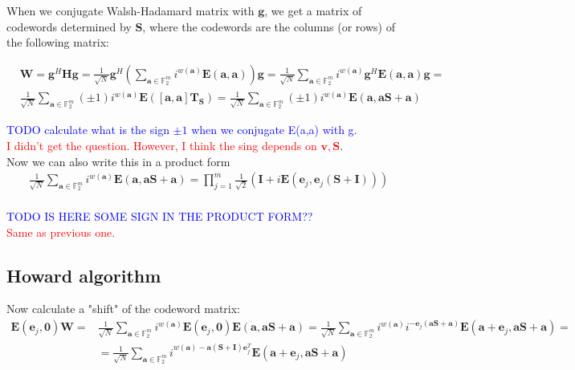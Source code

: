 \documentclass{article}
\begin{document}
	When we conjugate Walsh-Hadamard matrix with $\mathbf{g}$, we get a matrix of codewords determined by $\mathbf{S}$, where the codewords are the columns (or rows) of the following matrix:

	\begin{align*}
		&\mathbf{W} = \mathbf{g}^H\mathbf{H}\mathbf{g} = \frac{1}{\sqrt{N}}\mathbf{g}^H\left(\sum_{\mathbf{a} \in \mathbb{F}^m_2} i^{w(\mathbf{a})}\mathbf{E}(\mathbf{a},\mathbf{a})\right)\mathbf{g} = \frac{1}{\sqrt{N}}\sum_{\mathbf{a} \in \mathbb{F}^m_2} i^{w(\mathbf{a})}\mathbf{g}^H\mathbf{E}(\mathbf{a},\mathbf{a})\mathbf{g} = \\ &\frac{1}{\sqrt{N}}\sum_{\mathbf{a} \in \mathbb{F}^m_2}(\pm 1) i^{w(\mathbf{a})}\mathbf{E}(\left[\mathbf{a},\mathbf{a}\right]\mathbf{T}_\mathbf{S}) = \frac{1}{\sqrt{N}}\sum_{\mathbf{a} \in \mathbb{F}^m_2}(\pm 1) i^{w(\mathbf{a})}\mathbf{E}(\mathbf{a},\mathbf{a}\mathbf{S} + \mathbf{a})
	\end{align*}


	\textcolor{blue}{
TODO calculate what is the sign $\pm 1$ when we conjugate E(a,a) with g.	
}
\\

\textcolor{red}{I didn't get the question. However, I think the sing depends on $\mathbf{v, S}$}.
\\
	
	Now we can also write this in a product form
	\begin{align*}
		\frac{1}{\sqrt{N}} \sum_{\mathbf{a} \in \mathbb{F}^m_2} i^{w(\mathbf{a})}\mathbf{E}(\mathbf{a},\mathbf{a}\mathbf{S} + \mathbf{a}) = \prod_{j = 1}^m\frac{1}{\sqrt{2}}(\mathbf{I} + i\mathbf{E}(\mathbf{e}_j, \mathbf{e}_j(\mathbf{S} + \mathbf{I})))
	\end{align*}
	\\
	
	\textcolor{blue}{TODO IS HERE SOME SIGN IN THE PRODUCT FORM??}
	\\
	
	\textcolor{red}{Same as previous one.}
	
	\subsection*{Howard algorithm}
	Now calculate a "shift" of the codeword matrix:
	\begin{align*}
		\mathbf{E}(\mathbf{e}_j, \mathbf{0})\mathbf{W} = &\frac{1}{\sqrt{N}} \sum_{\mathbf{a} \in \mathbb{F}^m_2} i^{w(\mathbf{a})}\mathbf{E}(\mathbf{e}_j,\mathbf{0})\mathbf{E}(\mathbf{a},\mathbf{a}\mathbf{S} + \mathbf{a}) = \frac{1}{\sqrt{N}} \sum_{\mathbf{a} \in \mathbb{F}^m_2} i^{w(\mathbf{a})}i^{-\mathbf{e}_j(\mathbf{a}\mathbf{S} + \mathbf{a})}\mathbf{E}(\mathbf{a} + \mathbf{e}_j,\mathbf{a}\mathbf{S} + \mathbf{a})  = \\  &= \frac{1}{\sqrt{N}} \sum_{\mathbf{a} \in \mathbb{F}^m_2} i^{w(\mathbf{a})-\mathbf{a}(\mathbf{S} + \mathbf{I})\mathbf{e}_j^T}\mathbf{E}(\mathbf{a} + \mathbf{e}_j,\mathbf{a}\mathbf{S} + \mathbf{a})
	\end{align*}
	
\end{document}

